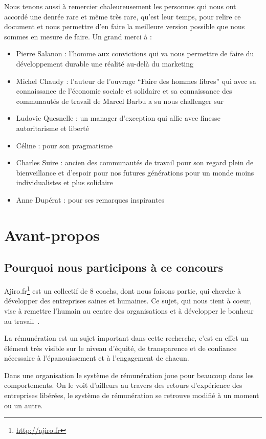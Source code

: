 \documentclass[12pt]{article}
\begin{document}
Nous tenons aussi à remercier chaleureusement les personnes qui nous ont accordé une denrée rare et même très rare, qu’est leur temps, pour relire ce document et nous permettre d’en faire la meilleure version possible que nous sommes en mesure de faire. Un grand merci à :
\begin{itemize}
  \item Pierre Salanon : l’homme aux convictions qui va nous permettre de faire du développement durable une réalité au-delà du marketing
  \item Michel Chaudy : l’auteur de l’ouvrage “Faire des hommes libres” qui avec sa connaissance de l’économie sociale et solidaire et sa connaissance des communautés de travail de Marcel Barbu a su nous challenger sur 
  \item Ludovic Quesnelle : un manager d’exception qui allie avec finesse autoritarisme et liberté
  \item Céline : pour son pragmatisme
  \item Charles Suire : ancien des communautés de travail pour son regard plein de bienveillance et d’espoir pour nos futures générations pour un monde moins individualistes et plus solidaire
  \item Anne Dupérat : pour ses remarques inspirantes
\end{itemize}


\section{Avant-propos}
\subsection{Pourquoi nous participons à ce concours}
 Ajiro.fr\footnote{\url{http://ajiro.fr}} est un collectif de 8 coachs, dont nous faisons partie, qui cherche à développer des entreprises saines et humaines. Ce sujet, qui nous tient à coeur, vise à remettre l’humain au centre des organisations et à développer le bonheur au travail~\cite{Getz, Laloux}.

La rémunération est un sujet important dans cette recherche, c’est en effet un élément très visible sur le niveau d’équité, de transparence et de confiance nécessaire à l'épanouissement et à l’engagement de chacun.

Dans une organisation le système de rémunération joue pour beaucoup dans les comportements. On le voit d’ailleurs au travers des retours d’expérience des entreprises libérées, le système de rémunération se retrouve modifié à un moment ou un autre. 
\end{document}
